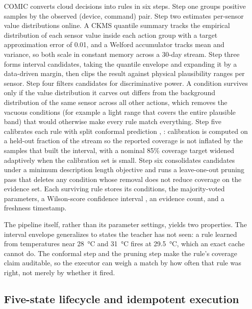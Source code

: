 \documentclass[11pt,a4paper]{article}
\begin{document}
COMIC converts cloud decisions into rules in six steps. Step one groups
positive samples by the observed (device, command) pair. Step two estimates
per-sensor value distributions online. A CKMS quantile summary \cite{24}
tracks the empirical distribution of each sensor value inside each action
group with a target approximation error of 0.01, and a Welford accumulator
\cite{25} tracks mean and variance, so both
scale in constant memory across a 30-day stream. Step three forms interval
candidates, taking the quantile envelope and expanding it by a data-driven
margin, then clips the result against physical plausibility ranges per sensor.
Step four filters candidates for discriminative power. A condition survives
only if the value distribution it carves out differs from the background
distribution of the same sensor across all other actions, which removes the
vacuous conditions (for example a light range that covers the entire
plausible band) that would otherwise make every rule match everything. Step
five calibrates each rule with split conformal prediction \cite{22},
\cite{23}: calibration is computed on a held-out fraction of the stream so
the reported coverage is not inflated by the samples that built the interval,
with a nominal 85\% coverage target widened adaptively when the calibration
set is small.
Step six consolidates candidates under a minimum description length objective
\cite{26} and runs a leave-one-out pruning pass that deletes any condition
whose removal does not reduce coverage on the evidence set. Each surviving
rule stores its conditions, the majority-voted parameters, a Wilson-score
confidence interval \cite{27}, an evidence count, and a freshness timestamp.

The pipeline itself, rather than its parameter settings, yields two
properties.
The interval envelope generalizes to states the teacher has not seen: a rule
learned from temperatures near 28~°C and 31~°C fires at 29.5~°C, which an exact
cache cannot do. The conformal step and the pruning step make the rule's
coverage claim auditable, so the executor can weigh a match by how often that
rule was right, not merely by whether it fired.

\subsection{Five-state lifecycle and idempotent execution}
\end{document}
